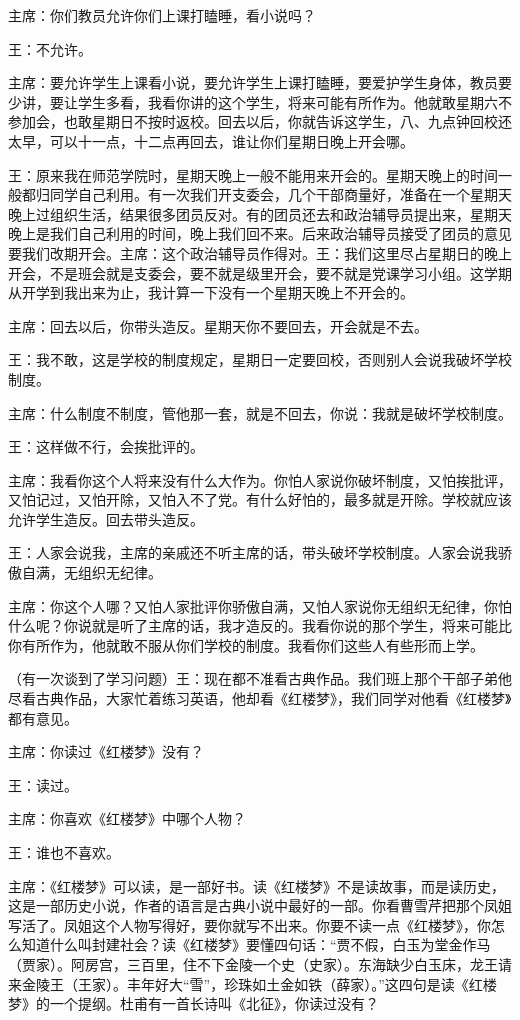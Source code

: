 主席：你们教员允许你们上课打瞌睡，看小说吗？

王：不允许。

主席：要允许学生上课看小说，要允许学生上课打瞌睡，要爱护学生身体，教员要少讲，要让学生多看，我看你讲的这个学生，将来可能有所作为。他就敢星期六不参加会，也敢星期日不按时返校。回去以后，你就告诉这学生，八、九点钟回校还太早，可以十一点，十二点再回去，谁让你们星期日晚上开会哪。

王：原来我在师范学院时，星期天晚上一般不能用来开会的。星期天晚上的时间一般都归同学自己利用。有一次我们开支委会，几个干部商量好，准备在一个星期天晚上过组织生活，结果很多团员反对。有的团员还去和政治辅导员提出来，星期天晚上是我们自己利用的时间，晚上我们回不来。后来政治辅导员接受了团员的意见要我们改期开会。主席：这个政治辅导员作得对。王：我们这里尽占星期日的晚上开会，不是班会就是支委会，要不就是级里开会，要不就是党课学习小组。这学期从开学到我出来为止，我计算一下没有一个星期天晚上不开会的。

主席：回去以后，你带头造反。星期天你不要回去，开会就是不去。

王：我不敢，这是学校的制度规定，星期日一定要回校，否则别人会说我破坏学校制度。

主席：什么制度不制度，管他那一套，就是不回去，你说：我就是破坏学校制度。

王：这样做不行，会挨批评的。

主席：我看你这个人将来没有什么大作为。你怕人家说你破坏制度，又怕挨批评，又怕记过，又怕开除，又怕入不了党。有什么好怕的，最多就是开除。学校就应该允许学生造反。回去带头造反。

王：人家会说我，主席的亲戚还不听主席的话，带头破坏学校制度。人家会说我骄傲自满，无组织无纪律。

主席：你这个人哪？又怕人家批评你骄傲自满，又怕人家说你无组织无纪律，你怕什么呢？你说就是听了主席的话，我才造反的。我看你说的那个学生，将来可能比你有所作为，他就敢不服从你们学校的制度。我看你们这些人有些形而上学。

（有一次谈到了学习问题）王：现在都不准看古典作品。我们班上那个干部子弟他尽看古典作品，大家忙着练习英语，他却看《红楼梦》，我们同学对他看《红楼梦》都有意见。

主席：你读过《红楼梦》没有？

王：读过。

主席：你喜欢《红楼梦》中哪个人物？

王：谁也不喜欢。

主席：《红楼梦》可以读，是一部好书。读《红楼梦》不是读故事，而是读历史，这是一部历史小说，作者的语言是古典小说中最好的一部。你看曹雪芹把那个凤姐写活了。凤姐这个人物写得好，要你就写不出来。你要不读一点《红楼梦》，你怎么知道什么叫封建社会？读《红楼梦》要懂四句话：“贾不假，白玉为堂金作马（贾家）。阿房宫，三百里，住不下金陵一个史（史家）。东海缺少白玉床，龙王请来金陵王（王家）。丰年好大“雪”，珍珠如土金如铁（薛家）。”这四句是读《红楼梦》的一个提纲。杜甫有一首长诗叫《北征》，你读过没有？

